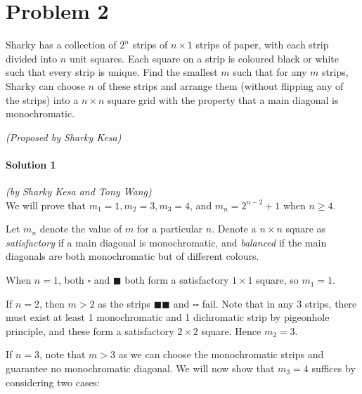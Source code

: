 \documentclass[10pt]{article}
\newcommand{\ws}{\square}
\newcommand{\bs}{\blacksquare}
\begin{document}
	\newpage
	
	\section*{Problem 2}
	
	Sharky has a collection of \(2^n\) strips of \(n \times 1\) strips of paper, with each strip divided into \(n\) unit squares. Each square on a strip is coloured black or white such that every strip is unique. Find the smallest \(m\) such that for any \(m\) strips, Sharky can choose \(n\) of these strips and arrange them (without flipping any of the strips) into a \(n \times n\) square grid with the property that a main diagonal is monochromatic.
	\begin{flushright}
	\textit{(Proposed by Sharky Kesa)}
	\end{flushright}
	
		\noindent \makebox[\linewidth]{\rule{\textwidth}{0.4pt}}
	
	\paragraph{Solution 1} \textit{(by Sharky Kesa and Tony Wang)}\\
	
	\noindent We will prove that \(m_1 = 1, m_2 = 3, m_3 = 4\), and \(m_n = 2^{n-2}+1\) when \(n \geq 4\).
	
	Let $m_n$ denote the value of $m$ for a particular \(n\). Denote a \(n \times n\) square as \emph{satisfactory} if a main diagonal is monochromatic, and \emph{balanced} if the main diagonals are both monochromatic but of different colours.  
	
	When \(n = 1\), both \(\ws\) and \(\bs\) both form a satisfactory \(1 \times 1\) square, so \(m_1 = 1\).
	
	If $n=2$, then $m > 2$ as the strips \(\bs \bs\) and \(\ws \ws\) fail. Note that in any 3 strips, there must exist at least 1 monochromatic and 1 dichromatic strip by pigeonhole principle, and these form a satisfactory \(2 \times 2\) square. Hence \(m_2 = 3\).
	
	If $n=3$, note that $m>3$ as we can choose the monochromatic strips and guarantee no monochromatic diagonal. We will now show that \(m_3 = 4\) suffices by considering two cases:
	
\end{document}
